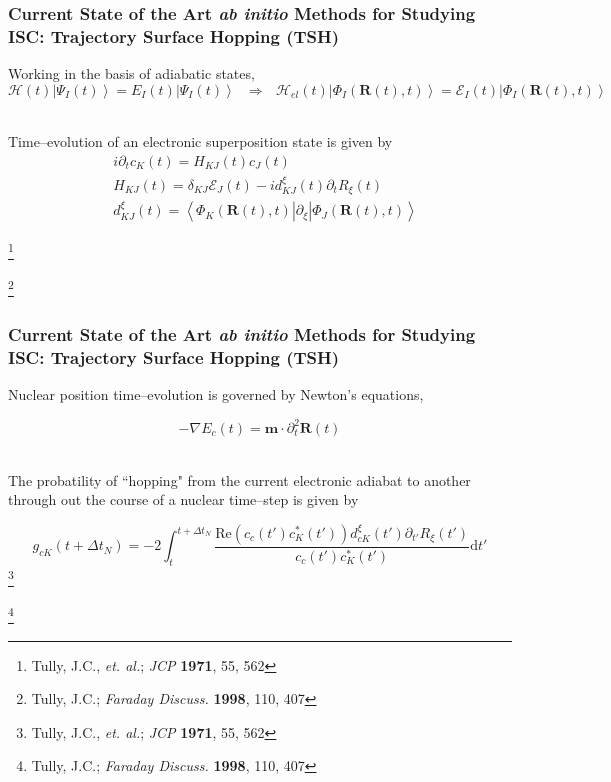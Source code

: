 \documentclass[usepdftitle=false,10pt]{beamer}
\newcommand{\ket}[1]{\left\vert #1 \right\rangle}         %
\newcommand{\innerop}[3]{\left\langle #1 \left\vert #2 \right\vert #3 \right\rangle}  %
\renewcommand{\Re}{\text{Re}}                             %
\newcommand*\vc[1]{\boldsymbol{#1}}
\newcommand*\op[1]{\mathcal{#1}}
\newcommand\blfootnote[1]{%
  \begingroup
  \renewcommand\thefootnote{}\footnote{#1}%
  \addtocounter{footnote}{-1}%
  \endgroup
}
\begin{document}
\begin{frame}
  \frametitle{Current State of the Art \emph{ab initio} Methods for Studying 
  ISC: Trajectory Surface Hopping (TSH)}

  Working in the basis of adiabatic states,
  \begin{equation*}
    \op{H}(t) \ket{\Psi_I (t)} = E_I(t) \ket{\Psi_I (t)}
    \text{ }\Longrightarrow \text{ }
    \op{H}_{el}(t)\ket{\Phi_I(\vc{R}(t),t)} = 
      \mathcal{E}_I(t)\ket{\Phi_I(\vc{R}(t),t)}
  \end{equation*}
  
  ~\\
  Time--evolution of an electronic superposition state is given by
  \begin{align*}
    &i  \partial_t c_K(t) = H_{KJ}(t) c_J(t) \\
    &H_{KJ}(t) = \delta_{KJ}\mathcal{E}_J(t) - i d_{KJ}^\xi (t) \partial_t R_{\xi}(t) \\
    &d_{KJ}^\xi (t) = \innerop{\Phi_K(\vc{R}(t),t)}{\partial_\xi}{\Phi_J(\vc{R}(t),t)}
  \end{align*}

  \blfootnote{\tiny Tully, J.C., \emph{et. al.}; \emph{JCP} \textbf{1971}, 55, 562}
  \blfootnote{\tiny Tully, J.C.; \emph{Faraday Discuss.} \textbf{1998}, 110, 407}
\end{frame}

\begin{frame}
  \frametitle{Current State of the Art \emph{ab initio} Methods for Studying 
  ISC: Trajectory Surface Hopping (TSH)}

  Nuclear position time--evolution is governed by Newton's equations,

  \begin{equation*}
    -\nabla E_c(t) = \vc{m}\cdot \partial_t^2\vc{R}(t)
  \end{equation*}

  ~\\
  The probatility of ``hopping" from the current electronic adiabat to another
  through out the course of a nuclear time--step is given by

  \begin{equation*}
    g_{cK}(t + \Delta t_N) = -2 \int_t^{t + \Delta t_N} 
      \frac{\Re(c_c(t') c^*_K(t'))d_{cK}^\xi (t') \partial_{t'}
      R_{\xi}(t')}{c_c(t') c^*_K(t')}\mathrm{d}t'
  \end{equation*}
  \blfootnote{\tiny Tully, J.C., \emph{et. al.}; \emph{JCP} \textbf{1971}, 55, 562}
  \blfootnote{\tiny Tully, J.C.; \emph{Faraday Discuss.} \textbf{1998}, 110, 407}
\end{frame}
\end{document}
